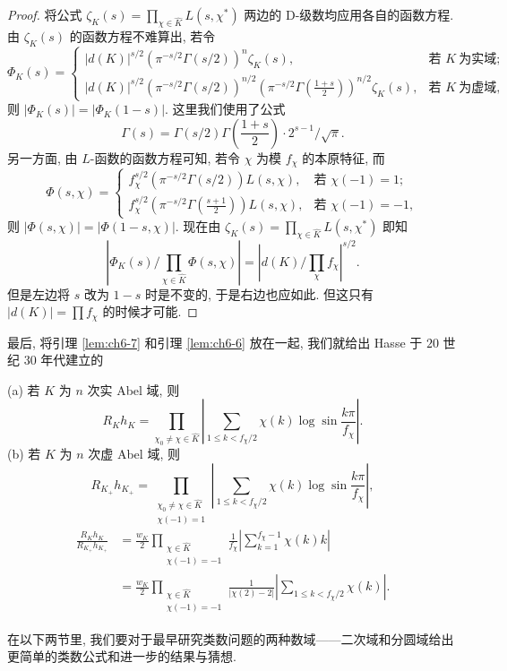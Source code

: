 \begin{proof}
将公式 $\zeta_K(s)=\prod_{\chi\in\widehat{K}}L(s,\chi^*)$ 两边的 D-级数均应用各自的函数方程. 由 $\zeta_K(s)$ 的函数方程不难算出, 若令
\[
  \Phi_K(s)=\begin{cases}
    |d(K)|^{s/2}(\pi^{-s/2}\Gamma(s/2))^n\zeta_K(s), & \text{若 } K\ \text{为实域};\\[0.5em]
    |d(K)|^{s/2}(\pi^{-s/2}\Gamma(s/2))^{n/2}\left(\pi^{-s/2}\Gamma\left(\frac{1+s}{2}\right)\right)^{n/2}\zeta_K(s), & \text{若 } K\ \text{为虚域},
  \end{cases}
\]
则 $|\Phi_K(s)|=|\Phi_K(1-s)|$. 这里我们使用了公式
\[
  \Gamma(s)=\Gamma(s/2)\Gamma\left(\frac{1+s}{2}\right)\cdot 2^{s-1}/\sqrt{\pi}.
\]
另一方面, 由 $L$-函数的函数方程可知, 若令 $\chi$ 为模 $f_\chi$ 的本原特征, 而
\[
  \Phi(s,\chi)=\begin{cases}
    f_\chi^{s/2}(\pi^{-s/2}\Gamma(s/2))L(s,\chi), & \text{若 } \chi(-1)=1;\\[0.5em]
    f_\chi^{s/2}\left(\pi^{-s/2}\Gamma\left(\frac{s+1}{2}\right)\right)L(s,\chi), & \text{若 } \chi(-1)=-1,
  \end{cases}
\]
则 $|\Phi(s,\chi)|=|\Phi(1-s,\chi)|$. 现在由 $\zeta_K(s)=\prod_{\chi\in\widehat{K}}L(s,\chi^*)$ 即知
\[
  \left|\Phi_K(s)\Big/\prod_{\chi\in\widehat{K}}\Phi(s,\chi)\right|=\left|d(K)\Big/\prod_\chi f_\chi\right|^{s/2}.
\]
但是左边将 $s$ 改为 $1-s$ 时是不变的, 于是右边也应如此. 但这只有 $|d(K)|=\prod f_\chi$ 的时候才可能.
\end{proof}

最后, 将引理 \ref{lem:ch6-7} 和引理 \ref{lem:ch6-6} 放在一起, 我们就给出 Hasse 于 $20$ 世纪 $30$ 年代建立的

\begin{theorem}\label{thm:6.2}
(a) 若 $K$ 为 $n$ 次实 Abel 域, 则
\[
  R_Kh_K=\prod_{\chi_0\neq\chi\in\widehat{K}}\left|\sum_{1\leqslant k<f_\chi/2}\chi(k)\log\sin\frac{k\pi}{f_\chi}\right|.
\]
(b) 若 $K$ 为 $n$ 次虚 Abel 域, 则
\[
  R_{K_+}h_{K_+}=\prod_{\substack{\chi_0\neq\chi\in\widehat{K}\\ \chi(-1)=1}}\left|\sum_{1\leqslant k<f_\chi/2}\chi(k)\log\sin\frac{k\pi}{f_\chi}\right|,
\]
\[
  \begin{aligned}
    \frac{R_Kh_K}{R_{K_+}h_{K_+}}&=\frac{w_K}{2}\prod_{\substack{\chi\in\widehat{K}\\ \chi(-1)=-1}}\frac{1}{f_\chi}\left|\sum_{k=1}^{f_\chi-1}\chi(k)k\right|\\
    &=\frac{w_K}{2}\prod_{\substack{\chi\in\widehat{K}\\ \chi(-1)=-1}}\frac{1}{|\chi(2)-2|}\left|\sum_{1\leqslant k<f_\chi/2}\chi(k)\right|.
  \end{aligned}
\]
\end{theorem}

在以下两节里, 我们要对于最早研究类数问题的两种数域——二次域和分圆域给出更简单的类数公式和进一步的结果与猜想.
